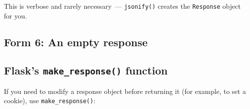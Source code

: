 \begin{codebox}[short]

\begin{Shaded}
\begin{Highlighting}[]

\OperatorTok{=}
\OperatorTok{=}\NormalTok{: }\NormalTok{\}),}
\OperatorTok{=}\NormalTok{,}
\OperatorTok{=}\NormalTok{,}
\NormalTok{)}
\end{Highlighting}
\end{Shaded}

\end{codebox}

\noindent{}This is verbose and rarely necessary~--- \texttt{jsonify()} creates the \texttt{Response} object for you.

\subsection*{Form 6: An empty response}\label{34-response-handling:form-6-an-empty-response}

\begin{codebox}[short]

\begin{Shaded}
\begin{Highlighting}[]
 \NormalTok{, }
\end{Highlighting}
\end{Shaded}

\end{codebox}

\subsection*{\texorpdfstring{Flask's \texttt{make\_response()} function}{Flask's make\_response() function}}\label{34-response-handling:flasks-make-response-function}

If you need to modify a response object before returning it (for example, to set a cookie), use \texttt{make\_response()}:

